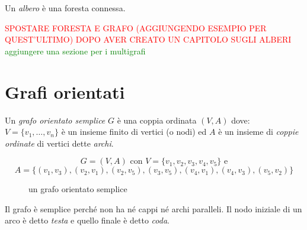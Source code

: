 \begin{defn}[albero]
	Un \emph{albero} è una foresta connessa.
\end{defn}

\textcolor{red}{SPOSTARE FORESTA E GRAFO (AGGIUNGENDO ESEMPIO PER QUEST'ULTIMO) DOPO AVER CREATO UN CAPITOLO SUGLI ALBERI}\\
\textcolor{green}{aggiungere una sezione per i multigrafi}

\section{Grafi orientati}
\begin{defn}
Un \emph{grafo orientato semplice} $G$ è una coppia ordinata $(V, A)$ dove:
$V = \{ v_1, \dots, v_n \}$ è un insieme finito di vertici (o nodi) ed
$A$ è un insieme di \emph{coppie ordinate} di vertici dette \emph{archi}.
\end{defn}

\begin{ese}
\[G = (V,A) \text{ con } V = \{ v_1, v_2, v_3, v_4, v_5 \} \text{ e} \]
\[A = \{ (v_1, v_3), (v_2, v_1), (v_2, v_5), (v_3, v_5), (v_4, v_1), (v_4, v_3), (v_5, v_2) \} \]
    \begin{figure}[H]
    \centering
        \caption{un grafo orientato semplice}
        \label{fig:grf_or_semplice}
    \end{figure}
	\QEDA
\end{ese}
Il grafo è semplice perché non ha né cappi né archi paralleli. %
Il nodo iniziale di un arco è detto \emph{testa} e quello finale è detto \emph{coda}.

